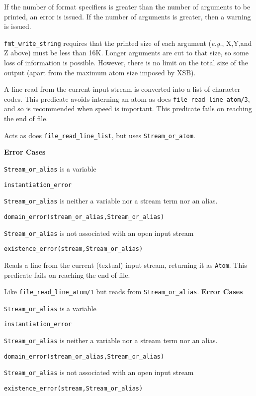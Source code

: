 \begin{description}
    If the number of format specifiers is greater than the number of
    arguments to be printed, an error is issued. If the number of arguments
    is greater, then a warning is issued.

    {\tt fmt\_write\_string} requires that the printed size of each
    argument ({\it e.g.}, X,Y,and Z above) must be less than 16K. Longer
    arguments are cut to that size, so some loss of information is possible.
    However, there is no limit on the total size of the output (apart from
    the maximum atom size imposed by XSB).

A line read from the current input stream is converted into a list of
character codes.  This predicate 
avoids interning an atom as does {\tt file\_read\_line\_atom/3}, and so is
recommended when speed is important.  This predicate fails on reaching
the end of file.

Acts as does {\tt file\_read\_line\_list}, but uses {\tt Stream\_or\_atom}.

{\bf Error Cases} 
\bi
\item 	{\tt Stream\_or\_alias} is a variable
\bi
\item {\tt instantiation\_error}
\ei
\item 	{\tt Stream\_or\_alias} is neither a variable nor a stream term nor an alias.
\bi
\item 	{\tt domain\_error(stream\_or\_alias,Stream\_or\_alias)}
\ei
\item 	{\tt Stream\_or\_alias} is not associated with an open input stream
\bi
\item 	{\tt existence\_error(stream,Stream\_or\_alias)}
\ei
\ei

%
Reads a line from the current (textual) input stream, returning it as
{\tt Atom}.  This predicate fails on reaching the end of file.

Like {\tt file\_read\_line\_atom/1} but reads from {\tt Stream\_or\_alias}.
%
{\bf Error Cases} 
\bi
\item 	{\tt Stream\_or\_alias} is a variable
\bi
\item {\tt instantiation\_error}
\ei
\item 	{\tt Stream\_or\_alias} is neither a variable nor a stream term nor an alias.
\bi
\item 	{\tt domain\_error(stream\_or\_alias,Stream\_or\_alias)}
\ei
\item 	{\tt Stream\_or\_alias} is not associated with an open input stream
\bi
\item 	{\tt existence\_error(stream,Stream\_or\_alias)}
\ei
\ei


\end{description}
